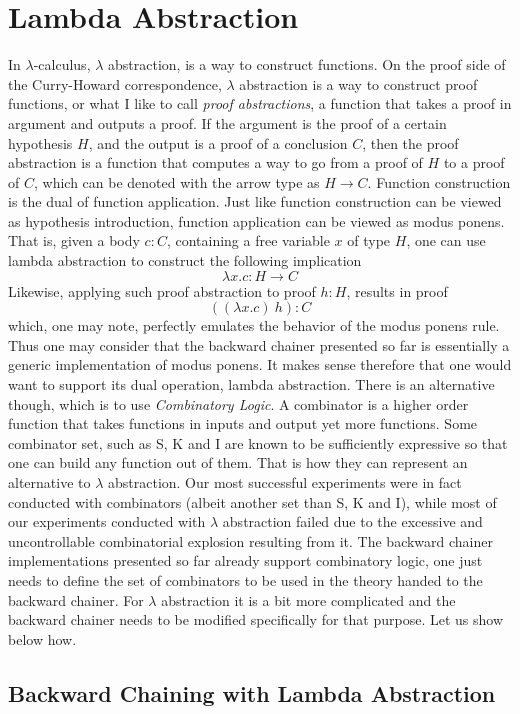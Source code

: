 \documentclass[]{report}
\begin{document}
\section{Lambda Abstraction}
\label{sec:lambdabs}
In $\lambda$-calculus, $\lambda$ abstraction, is a way to construct
functions.  On the proof side of the Curry-Howard correspondence,
$\lambda$ abstraction is a way to construct proof functions, or what I
like to call \emph{proof abstractions}, a function that takes a proof
in argument and outputs a proof.  If the argument is the proof of a
certain hypothesis $H$, and the output is a proof of a conclusion $C$,
then the proof abstraction is a function that computes a way to go
from a proof of $H$ to a proof of $C$, which can be denoted with the
arrow type as $H \to C$.  Function construction is the dual of
function application.  Just like function construction can be viewed
as hypothesis introduction, function application can be viewed as
modus ponens.  That is, given a body $c : C$, containing a free
variable $x$ of type $H$, one can use lambda abstraction to construct
the following implication $$\lambda x. c : H \to C$$ Likewise,
applying such proof abstraction to proof $h : H$, results in
proof $$((\lambda x. c)\ h) : C$$ which, one may note, perfectly
emulates the behavior of the modus ponens rule.  Thus one may consider
that the backward chainer presented so far is essentially a generic
implementation of modus ponens.  It makes sense therefore that one
would want to support its dual operation, lambda abstraction.  There
is an alternative though, which is to use \emph{Combinatory Logic}.  A
combinator is a higher order function that takes functions in inputs
and output yet more functions.  Some combinator set, such as S, K and
I are known to be sufficiently expressive so that one can build any
function out of them.  That is how they can represent an alternative
to $\lambda$ abstraction.  Our most successful experiments were in
fact conducted with combinators (albeit another set than S, K and I),
while most of our experiments conducted with $\lambda$ abstraction
failed due to the excessive and uncontrollable combinatorial explosion
resulting from it.  The backward chainer implementations presented so
far already support combinatory logic, one just needs to define the
set of combinators to be used in the theory handed to the backward
chainer.  For $\lambda$ abstraction it is a bit more complicated and
the backward chainer needs to be modified specifically for that
purpose.  Let us show below how.

\subsection{Backward Chaining with Lambda Abstraction}
\end{document}
